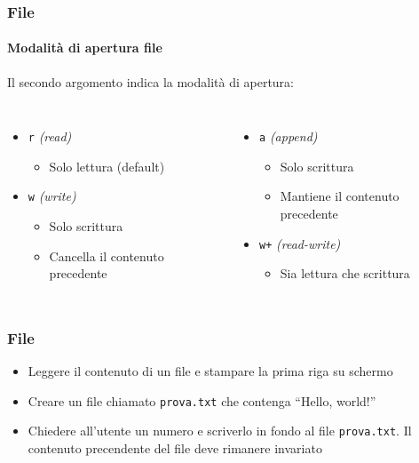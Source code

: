 \begin{contentframe}
    \frametitle{File}
    \framesubtitle{Modalità di apertura file}

    Il secondo argomento indica la modalità di apertura:
    
    \begin{columns}
        \begin{itemize}
            \item \texttt{r} \textit{(read)}
            \begin{itemize}
                \item Solo lettura (default)
            \end{itemize}
            \item \texttt{w} \textit{(write)}
            \begin{itemize}
                \item Solo scrittura
                \item Cancella il contenuto precedente
            \end{itemize}
        \end{itemize}
    
        \begin{itemize}
            \item \texttt{a} \textit{(append)}
            \begin{itemize}
                \item Solo scrittura
                \item Mantiene il contenuto precedente
            \end{itemize}
            \item \texttt{w+} \textit{(read-write)}
            \begin{itemize}
                \item Sia lettura che scrittura
            \end{itemize}
        \end{itemize}
    \end{columns}
\end{contentframe}

\begin{exerciseframe}
    \frametitle{File}

    \begin{itemize}
        \item Leggere il contenuto di un file e stampare la prima riga su schermo
        \bigskip
        \item Creare un file chiamato \texttt{prova.txt} che contenga ``Hello, world!''
        \bigskip
        \item Chiedere all'utente un numero e scriverlo in fondo al file \texttt{prova.txt}. Il contenuto precendente del file deve rimanere invariato
    \end{itemize}
\end{exerciseframe}

